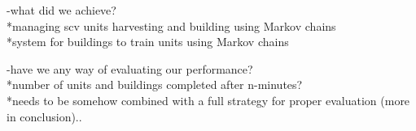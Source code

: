 -what did we achieve?\\
 *managing scv units harvesting and building using Markov chains\\
 *system for buildings to train units using Markov chains

-have we any way of evaluating our performance?\\
 *number of units and buildings completed after n-minutes?\\
 *needs to be somehow combined with a full strategy for proper evaluation (more in conclusion)..